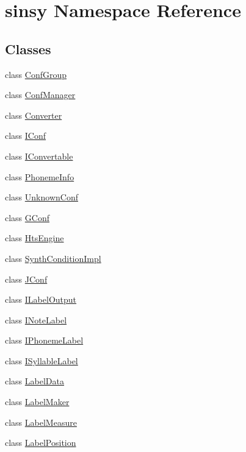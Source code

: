 \hypertarget{namespacesinsy}{\section{sinsy \-Namespace \-Reference}
\label{namespacesinsy}
}
\subsection*{\-Classes}
\begin{DoxyCompactItemize}
\item 
class \hyperlink{classsinsy_1_1ConfGroup}{\-Conf\-Group}
\item 
class \hyperlink{classsinsy_1_1ConfManager}{\-Conf\-Manager}
\item 
class \hyperlink{classsinsy_1_1Converter}{\-Converter}
\item 
class \hyperlink{classsinsy_1_1IConf}{\-I\-Conf}
\item 
class \hyperlink{classsinsy_1_1IConvertable}{\-I\-Convertable}
\item 
class \hyperlink{classsinsy_1_1PhonemeInfo}{\-Phoneme\-Info}
\item 
class \hyperlink{classsinsy_1_1UnknownConf}{\-Unknown\-Conf}
\item 
class \hyperlink{classsinsy_1_1GConf}{\-G\-Conf}
\item 
class \hyperlink{classsinsy_1_1HtsEngine}{\-Hts\-Engine}
\item 
class \hyperlink{classsinsy_1_1SynthConditionImpl}{\-Synth\-Condition\-Impl}
\item 
class \hyperlink{classsinsy_1_1JConf}{\-J\-Conf}
\item 
class \hyperlink{classsinsy_1_1ILabelOutput}{\-I\-Label\-Output}
\item 
class \hyperlink{classsinsy_1_1INoteLabel}{\-I\-Note\-Label}
\item 
class \hyperlink{classsinsy_1_1IPhonemeLabel}{\-I\-Phoneme\-Label}
\item 
class \hyperlink{classsinsy_1_1ISyllableLabel}{\-I\-Syllable\-Label}
\item 
class \hyperlink{classsinsy_1_1LabelData}{\-Label\-Data}
\item 
class \hyperlink{classsinsy_1_1LabelMaker}{\-Label\-Maker}
\item 
class \hyperlink{classsinsy_1_1LabelMeasure}{\-Label\-Measure}
\item 
class \hyperlink{classsinsy_1_1LabelPosition}{\-Label\-Position}
\item 

\end{DoxyCompactItemize}
